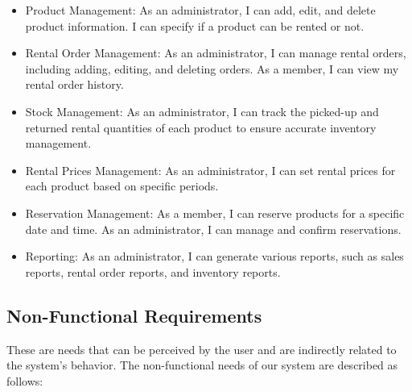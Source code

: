 \begin{itemize}
    \item Product Management: As an administrator, I can add, edit, and delete product information. I can specify if a product can be rented or not.
    \item Rental Order Management: As an administrator, I can manage rental orders, including adding, editing, and deleting orders. As a member, I can view my rental order history.
    \item Stock Management: As an administrator, I can track the picked-up and returned rental quantities of each product to ensure accurate inventory management.
    \item Rental Prices Management: As an administrator, I can set rental prices for each product based on specific periods.
    \item Reservation Management: As a member, I can reserve products for a specific date and time. As an administrator, I can manage and confirm reservations.
    \item Reporting: As an administrator, I can generate various reports, such as sales reports, rental order reports, and inventory reports.
\end{itemize}

\subsection{Non-Functional Requirements}

These are needs that can be perceived by the user and are indirectly related to the system's behavior. The non-functional needs of our system are described as follows:

